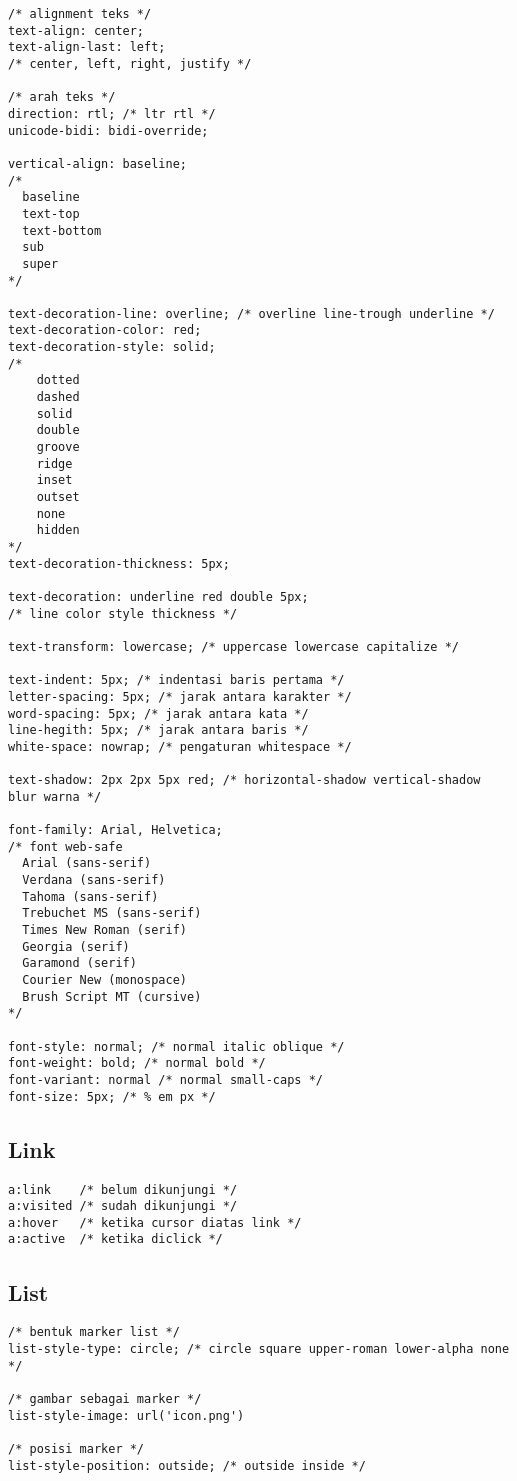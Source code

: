 \documentclass[12pt,a4paper]{article}
\begin{document}
\begin{lstlisting}
/* alignment teks */
text-align: center; 
text-align-last: left;
/* center, left, right, justify */

/* arah teks */
direction: rtl; /* ltr rtl */
unicode-bidi: bidi-override;

vertical-align: baseline; 
/*
  baseline
  text-top
  text-bottom
  sub
  super
*/

text-decoration-line: overline; /* overline line-trough underline */
text-decoration-color: red;
text-decoration-style: solid;
/*
    dotted
    dashed
    solid 
    double
    groove
    ridge 
    inset 
    outset
    none
    hidden
*/
text-decoration-thickness: 5px;

text-decoration: underline red double 5px;
/* line color style thickness */

text-transform: lowercase; /* uppercase lowercase capitalize */

text-indent: 5px; /* indentasi baris pertama */
letter-spacing: 5px; /* jarak antara karakter */
word-spacing: 5px; /* jarak antara kata */
line-hegith: 5px; /* jarak antara baris */
white-space: nowrap; /* pengaturan whitespace */

text-shadow: 2px 2px 5px red; /* horizontal-shadow vertical-shadow blur warna */

font-family: Arial, Helvetica;
/* font web-safe
  Arial (sans-serif)
  Verdana (sans-serif)
  Tahoma (sans-serif)
  Trebuchet MS (sans-serif)
  Times New Roman (serif)
  Georgia (serif)
  Garamond (serif)
  Courier New (monospace)
  Brush Script MT (cursive)
*/

font-style: normal; /* normal italic oblique */
font-weight: bold; /* normal bold */
font-variant: normal /* normal small-caps */
font-size: 5px; /* % em px */
\end{lstlisting}

\subsection*{Link}
\begin{lstlisting}
a:link    /* belum dikunjungi */
a:visited /* sudah dikunjungi */
a:hover   /* ketika cursor diatas link */
a:active  /* ketika diclick */
\end{lstlisting}

\subsection*{List}
\begin{lstlisting}
/* bentuk marker list */
list-style-type: circle; /* circle square upper-roman lower-alpha none */

/* gambar sebagai marker */
list-style-image: url('icon.png')

/* posisi marker */
list-style-position: outside; /* outside inside */
\end{lstlisting}
\end{document}
